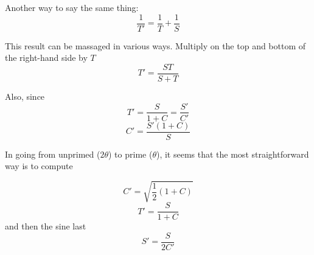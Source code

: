 \documentclass[11pt, oneside]{article}
\begin{document}
Another way to say the same thing:
\[ \frac{1}{T'} = \frac{1}{T} + \frac{1}{S} \]

This result can be massaged in various ways.  Multiply on the top and bottom of the right-hand side by $T$
\[ T' = \frac{ST}{S + T} \]

Also, since
\[ T'  = \frac{S}{1 + C} = \frac{S'}{C'} \]
\[ C' = \frac{S'(1+C)}{S} \]

In going from unprimed ($2 \theta$) to prime ($\theta$), it seems that the most straightforward way is to compute

\[ C' = \sqrt{\frac{1}{2} (1 + C)}  \]
\[ T'  = \frac{S}{1 + C} \]
and then the sine last
\[ S' = \frac{S}{2 C'} \]
\end{document}
